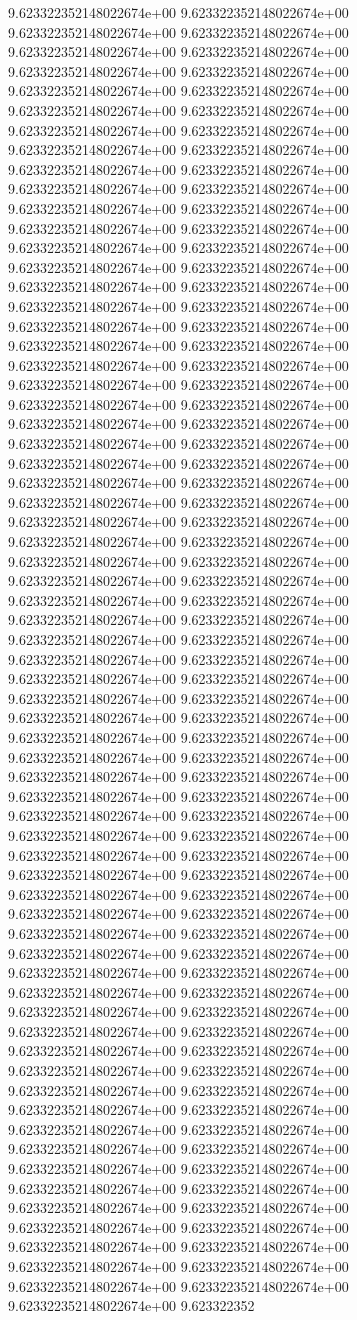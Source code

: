 9.623322352148022674e+00	9.623322352148022674e+00	9.623322352148022674e+00	9.623322352148022674e+00	9.623322352148022674e+00	9.623322352148022674e+00	9.623322352148022674e+00	9.623322352148022674e+00	9.623322352148022674e+00	9.623322352148022674e+00	9.623322352148022674e+00	9.623322352148022674e+00	9.623322352148022674e+00	9.623322352148022674e+00	9.623322352148022674e+00	9.623322352148022674e+00	9.623322352148022674e+00	9.623322352148022674e+00	9.623322352148022674e+00	9.623322352148022674e+00	9.623322352148022674e+00	9.623322352148022674e+00	9.623322352148022674e+00	9.623322352148022674e+00	9.623322352148022674e+00	9.623322352148022674e+00	9.623322352148022674e+00	9.623322352148022674e+00	9.623322352148022674e+00	9.623322352148022674e+00	9.623322352148022674e+00	9.623322352148022674e+00	9.623322352148022674e+00	9.623322352148022674e+00	9.623322352148022674e+00	9.623322352148022674e+00	9.623322352148022674e+00	9.623322352148022674e+00	9.623322352148022674e+00	9.623322352148022674e+00	9.623322352148022674e+00	9.623322352148022674e+00	9.623322352148022674e+00	9.623322352148022674e+00	9.623322352148022674e+00	9.623322352148022674e+00	9.623322352148022674e+00	9.623322352148022674e+00	9.623322352148022674e+00	9.623322352148022674e+00	9.623322352148022674e+00	9.623322352148022674e+00	9.623322352148022674e+00	9.623322352148022674e+00	9.623322352148022674e+00	9.623322352148022674e+00	9.623322352148022674e+00	9.623322352148022674e+00	9.623322352148022674e+00	9.623322352148022674e+00	9.623322352148022674e+00	9.623322352148022674e+00	9.623322352148022674e+00	9.623322352148022674e+00	9.623322352148022674e+00	9.623322352148022674e+00	9.623322352148022674e+00	9.623322352148022674e+00	9.623322352148022674e+00	9.623322352148022674e+00	9.623322352148022674e+00	9.623322352148022674e+00	9.623322352148022674e+00	9.623322352148022674e+00	9.623322352148022674e+00	9.623322352148022674e+00	9.623322352148022674e+00	9.623322352148022674e+00	9.623322352148022674e+00	9.623322352148022674e+00	9.623322352148022674e+00	9.623322352148022674e+00	9.623322352148022674e+00	9.623322352148022674e+00	9.623322352148022674e+00	9.623322352148022674e+00	9.623322352148022674e+00	9.623322352148022674e+00	9.623322352148022674e+00	9.623322352148022674e+00	9.623322352148022674e+00	9.623322352148022674e+00	9.623322352148022674e+00	9.623322352148022674e+00	9.623322352148022674e+00	9.623322352148022674e+00	9.623322352148022674e+00	9.623322352148022674e+00	9.623322352148022674e+00	9.623322352148022674e+00	9.623322352148022674e+00	9.623322352148022674e+00	9.623322352148022674e+00	9.623322352148022674e+00	9.623322352148022674e+00	9.623322352148022674e+00	9.623322352148022674e+00	9.623322352148022674e+00	9.623322352148022674e+00	9.623322352148022674e+00	9.623322352148022674e+00	9.623322352148022674e+00	9.623322352148022674e+00	9.623322352148022674e+00	9.623322352148022674e+00	9.623322352148022674e+00	9.623322352148022674e+00	9.623322352148022674e+00	9.623322352148022674e+00	9.623322352148022674e+00	9.623322352148022674e+00	9.623322352148022674e+00	9.623322352148022674e+00	9.623322352148022674e+00	9.623322352148022674e+00	9.623322352148022674e+00	9.623322352148022674e+00	9.623322352148022674e+00	9.623322352148022674e+00	9.623322352148022674e+00	9.623322352148022674e+00	9.623322352148022674e+00	9.623322352148022674e+00	9.623322352